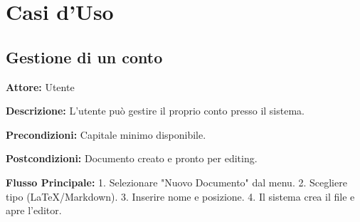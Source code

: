 \section{Casi d'Uso}

\subsection{Gestione di un conto}

\textbf{Attore:} Utente

\textbf{Descrizione:} L'utente può gestire il proprio conto presso il sistema.

\textbf{Precondizioni:} Capitale minimo disponibile.

\textbf{Postcondizioni:} Documento creato e pronto per editing.

\textbf{Flusso Principale:}
1. Selezionare "Nuovo Documento" dal menu.
2. Scegliere tipo (LaTeX/Markdown).
3. Inserire nome e posizione.
4. Il sistema crea il file e apre l'editor.